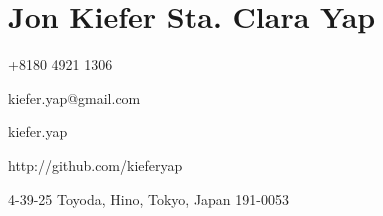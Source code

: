 \section*{\hfill Jon Kiefer Sta. Clara Yap \hfill}

\speciallinebreak
\begin{description}
	\begin{multicols}{2}
		\item[\faPhone] +8180 4921 1306
		\item[\faEnvelope] kiefer.yap@gmail.com        
                
		\item[\faSkype] kiefer.yap
		\item[\faGit] http://github.com/kieferyap
	\end{multicols}	
    \item[\faMapMarker] 4-39-25 Toyoda, Hino, Tokyo, Japan 191-0053
\end{description}